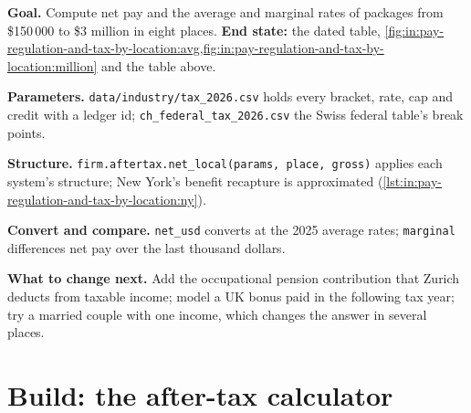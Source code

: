 \begin{tutorial}
\textbf{Goal.} Compute net pay and the average and marginal rates of packages from \$150\,000 to \$3 million in eight
places. \textbf{End state:} the dated table,
\cref{fig:in:pay-regulation-and-tax-by-location:avg,fig:in:pay-regulation-and-tax-by-location:million} and the table above.
\begin{tutsteps}
\item \textbf{Parameters.} \texttt{data/industry/tax\_2026.csv} holds every bracket, rate, cap and credit with a ledger id;
\texttt{ch\_federal\_tax\_2026.csv} the Swiss federal table's break points.
\item \textbf{Structure.} \texttt{firm.aftertax.net\_local(params, place, gross)} applies each system's structure; New York's
benefit recapture is approximated (\cref{lst:in:pay-regulation-and-tax-by-location:ny}).
\label{lst:in:pay-regulation-and-tax-by-location:ny}
\item \textbf{Convert and compare.} \texttt{net\_usd} converts at the 2025 average rates; \texttt{marginal} differences
net pay over the last thousand dollars.
\end{tutsteps}
\end{tutorial}

\textbf{What to change next.} Add the occupational pension contribution that Zurich deducts from taxable income; model a
UK bonus paid in the following tax year; try a married couple with one income, which changes the answer in several places.

\section{Build: the after-tax calculator}\label{bld:in:pay-regulation-and-tax-by-location:aftertax}

